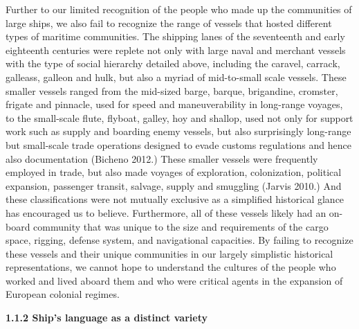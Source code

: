 \begin{styleNormali}
Further to our limited recognition of the people who made up the communities of large ships, we also fail to recognize the range of vessels that hosted different types of maritime communities. The shipping lanes of the seventeenth and early eighteenth centuries were replete not only with large naval and merchant vessels with the type of social hierarchy detailed above, including the caravel, carrack, galleass, galleon and hulk, but also a myriad of mid-to-small scale vessels. These smaller vessels ranged from the mid-sized barge, barque, brigandine, cromster, frigate and pinnacle, used for speed and maneuverability in long-range voyages, to the small-scale flute, flyboat, galley, hoy and shallop, used not only for support work such as supply and boarding enemy vessels, but also surprisingly long-range but small-scale trade operations designed to evade customs regulations and hence also documentation (Bicheno 2012.) These smaller vessels were frequently employed in trade, but also made voyages of exploration, colonization, political expansion, passenger transit, salvage, supply and smuggling (Jarvis 2010.) And these classifications were not mutually exclusive as a simplified historical glance has encouraged us to believe. Furthermore, all of these vessels likely had an on-board community that was unique to the size and requirements of the cargo space, rigging, defense system, and navigational capacities. By failing to recognize these vessels and their unique communities in our largely simplistic historical representations, we cannot hope to understand the cultures of the people who worked and lived aboard them and who were critical agents in the expansion of European colonial regimes. 
\end{styleNormali}

\begin{styleNormali}
\textbf{1.1.2 Ship’s language as a distinct variety}
\end{styleNormali}

